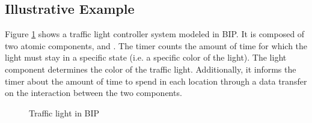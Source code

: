 \subsection{Illustrative Example}
Figure \ref{fig:traffic:bip} shows a traffic light controller system modeled in BIP. 
It is composed of two atomic components,  and . The timer counts
the amount of time for which the light must stay in a specific state (i.e. a specific
color of the light). The light component determines the color of the traffic light. Additionally, it
informs the timer about the amount of time to spend in each location through a data transfer on the interaction between the two components. 

\begin{figure}[h!]
 \centering
 \resizebox{0.5\textwidth}{!}{
   
 }
 \caption{Traffic light in BIP}
 \label{fig:traffic:bip}
\end{figure}

